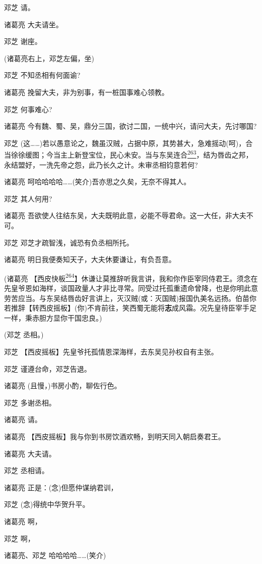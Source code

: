 邓芝 请。

诸葛亮 大夫请坐。

邓芝 谢座。

(诸葛亮右上，邓芝左偏，坐)

邓芝 不知丞相有何面谕?

诸葛亮 挽留大夫，非为别事，有一桩国事难心领教。

邓芝 何事难心?

诸葛亮 今有魏、蜀、吴，鼎分三国，欲讨二国，一统中兴，请问大夫，先讨哪国?

邓芝
(这\ldots{}\ldots{})若以愚意论之，魏虽汉贼，占据中原，其势甚大，急难摇动(呵)，合当徐徐缓图；今当主上新登宝位，民心未安。当与东吴连合\protect\hyperlink{fn263}{\textsuperscript{263}}，结为唇齿之邦，永结盟好，一洗先帝之怨，此乃长久之计。未审丞相钧意若何?

诸葛亮 呵哈哈哈哈\ldots{}\ldots{}(笑介)吾亦思之久矣，无奈不得其人。

邓芝 其人何用?

诸葛亮
吾欲使人往结东吴，大夫既明此意，必能不辱君命。这一大任，非大夫不可。

邓芝 邓芝才疏智浅，诚恐有负丞相所托。

诸葛亮 明日我便奏知天子，大夫休要谦让，有负吾意。

(诸葛亮
【西皮快板\protect\hyperlink{fn264}{\textsuperscript{264}}】休谦让莫推辞听我言讲，我和你作臣宰同侍君王。须念在先皇爷恩如海样，谈国政量人才非比寻常。同受过托孤重遗命曾降，也是你明此意劳苦应当。与东吴结唇齿好言讲上，灭汉贼(或：灭国贼)报国仇美名远扬。伯苗你若推辞【转西皮摇板】(你)不肯前往，笑西蜀无能将\textbf{志}成风霜。况先皇待臣宰手足一样，秉赤胆方显你干国忠良。)

(邓芝 丞相。)

邓芝 【西皮摇板】先皇爷托孤情恩深海样，去东吴见孙权自有主张。

邓芝 谨遵台命，邓芝告退。

诸葛亮 (且慢，)书房小酌，聊佐行色。

邓芝 多谢丞相。

诸葛亮 请。

诸葛亮 【西皮摇板】我与你到书房饮酒欢畅，到明天同入朝启奏君王。

诸葛亮 大夫请。

邓芝 丞相请。

诸葛亮 正是：(念)但愿仲谋纳君训，

邓芝 (念)得统中华贺升平。

诸葛亮 啊，

邓芝 啊，

诸葛亮、邓芝 哈哈哈哈\ldots{}\ldots{}(笑介)

